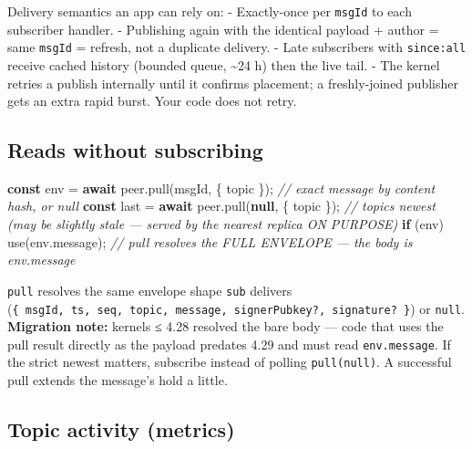 \documentclass[
  nobib]{tufte-handout}
\newenvironment{Shaded}{}{}
\newcommand{\AttributeTok}[1]{\textcolor[rgb]{0.49,0.56,0.16}{#1}}
\newcommand{\CommentTok}[1]{\textcolor[rgb]{0.38,0.63,0.69}{\textit{#1}}}
\newcommand{\ControlFlowTok}[1]{\textcolor[rgb]{0.00,0.44,0.13}{\textbf{#1}}}
\newcommand{\FunctionTok}[1]{\textcolor[rgb]{0.02,0.16,0.49}{#1}}
\newcommand{\KeywordTok}[1]{\textcolor[rgb]{0.00,0.44,0.13}{\textbf{#1}}}
\newcommand{\NormalTok}[1]{#1}
\newcommand{\OperatorTok}[1]{\textcolor[rgb]{0.40,0.40,0.40}{#1}}
\begin{document}
Delivery semantics an app can rely on: - Exactly-once per \texttt{msgId}
to each subscriber handler. - Publishing again with the identical
payload + author = same \texttt{msgId} = refresh, not a duplicate
delivery. - Late subscribers with
\texttt{since:\textquotesingle{}all\textquotesingle{}} receive cached
history (bounded queue, \textasciitilde24 h) then the live tail. - The
kernel retries a publish internally until it confirms placement; a
freshly-joined publisher gets an extra rapid burst. Your code does not
retry.

\subsection{Reads without subscribing}\label{reads-without-subscribing}

\begin{Shaded}
\begin{Highlighting}[]
\KeywordTok{const}\NormalTok{ env  }\OperatorTok{=} \ControlFlowTok{await}\NormalTok{ peer}\OperatorTok{.}\FunctionTok{pull}\NormalTok{(msgId}\OperatorTok{,}\NormalTok{ \{ topic \})}\OperatorTok{;}        \CommentTok{// exact message by content hash, or null}
\KeywordTok{const}\NormalTok{ last }\OperatorTok{=} \ControlFlowTok{await}\NormalTok{ peer}\OperatorTok{.}\FunctionTok{pull}\NormalTok{(}\KeywordTok{null}\OperatorTok{,}\NormalTok{  \{ topic \})}\OperatorTok{;}        \CommentTok{// topic\textquotesingle{}s newest (may be slightly stale — served by the nearest replica ON PURPOSE)}
\ControlFlowTok{if}\NormalTok{ (env) }\FunctionTok{use}\NormalTok{(env}\OperatorTok{.}\AttributeTok{message}\NormalTok{)}\OperatorTok{;}                             \CommentTok{// pull resolves the FULL ENVELOPE — the body is env.message}
\end{Highlighting}
\end{Shaded}

\texttt{pull} resolves the same envelope shape \texttt{sub} delivers
(\texttt{\{\ msgId,\ ts,\ seq,\ topic,\ message,\ signerPubkey?,\ signature?\ \}})
or \texttt{null}. \textbf{Migration note:} kernels ≤ 4.28 resolved the
bare body --- code that uses the pull result directly as the payload
predates 4.29 and must read \texttt{env.message}. If the strict newest
matters, subscribe instead of polling \texttt{pull(null)}. A successful
pull extends the message's hold a little.

\subsection{Topic activity (metrics)}\label{topic-activity-metrics}
\end{document}
